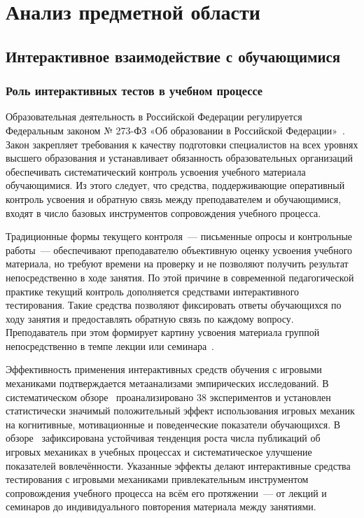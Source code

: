 \section[АНАЛИЗ ПРЕДМЕТНОЙ ОБЛАСТИ]{Анализ предметной области}
\thispagestyle{plain}

\subsection{Интерактивное взаимодействие с обучающимися}

\subsubsection{Роль интерактивных тестов в учебном процессе}

Образовательная деятельность в Российской Федерации регулируется
Федеральным законом № 273-ФЗ «Об образовании в Российской
Федерации»~\cite{fz273}. Закон закрепляет требования к качеству
подготовки специалистов на всех уровнях высшего образования
и устанавливает обязанность образовательных организаций обеспечивать
систематический контроль усвоения учебного материала обучающимися.
Из этого следует, что средства, поддерживающие оперативный контроль
усвоения и обратную связь между преподавателем и обучающимися,
входят в число базовых инструментов сопровождения учебного процесса.

Традиционные формы текущего контроля~--- письменные опросы
и контрольные работы~--- обеспечивают преподавателю объективную оценку
усвоения учебного материала, но требуют времени на проверку
и не позволяют получить результат непосредственно в ходе занятия.
По этой причине в современной педагогической практике текущий
контроль дополняется средствами интерактивного тестирования.
Такие средства позволяют фиксировать ответы обучающихся по ходу
занятия и предоставлять обратную связь по каждому вопросу.
Преподаватель при этом формирует картину усвоения материала
группой непосредственно в темпе лекции или
семинара~\cite{sagindykova2015,braude2020}.

Эффективность применения интерактивных средств обучения с игровыми
механиками подтверждается метаанализами эмпирических исследований.
В систематическом обзоре~\cite{sailer2020} проанализировано
38 экспериментов и установлен статистически значимый положительный
эффект использования игровых механик на когнитивные, мотивационные
и поведенческие показатели обучающихся. В обзоре~\cite{koivisto2019}
зафиксирована устойчивая тенденция роста числа публикаций об
игровых механиках в учебных процессах и систематическое улучшение
показателей вовлечённости. Указанные эффекты делают интерактивные
средства тестирования с игровыми механиками привлекательным
инструментом сопровождения учебного процесса на всём его
протяжении~--- от лекций и семинаров до индивидуального повторения
материала между занятиями.

